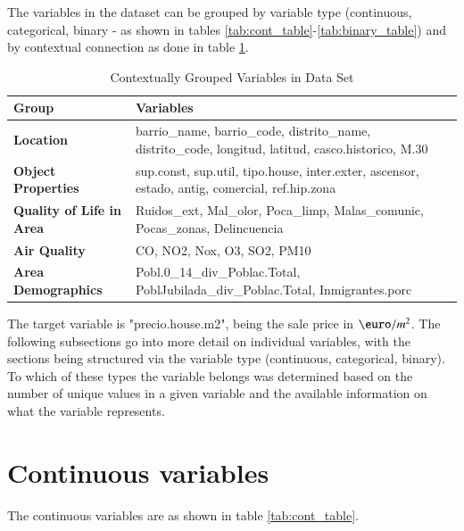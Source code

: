 \documentclass[11pt]{report} %
\begin{document}
The variables in the dataset can be grouped by variable type (continuous, categorical, binary - as shown in tables \ref{tab:cont_table}-\ref{tab:binary_table}) and by contextual connection as done in table \ref{tab:grouped_variables}.

\begin{table}[H]
\centering
\caption{Contextually Grouped Variables in Data Set}
\label{tab:grouped_variables}
\begin{tabular}{@{}lp{10cm}@{}}
\toprule
\textbf{Group} & \textbf{Variables} \\ \midrule
\textbf{Location} & barrio\_name, barrio\_code, distrito\_name, distrito\_code, longitud, latitud, casco.historico, M.30 \\ 
\textbf{Object Properties} & sup.const, sup.util, tipo.house, inter.exter, ascensor, estado, antig, comercial, ref.hip.zona \\ 
\textbf{Quality of Life in Area} & Ruidos\_ext, Mal\_olor, Poca\_limp, Malas\_comunic, Pocas\_zonas, Delincuencia \\ 
\textbf{Air Quality} & CO, NO2, Nox, O3, SO2, PM10 \\ 
\textbf{Area Demographics} & Pobl.0\_14\_div\_Poblac.Total, PoblJubilada\_div\_Poblac.Total, Inmigrantes.porc \\ \bottomrule
\end{tabular}
\end{table}


The target variable is "precio.house.m2", being the sale price in $\text{\euro}/m^2$. The following subsections go into more detail on individual variables, with the sections being structured via the variable type (continuous, categorical, binary). To which of these types the variable belongs was determined based on the number of unique values in a given variable and the available information on what the variable represents.


\section{Continuous variables}

The continuous variables are as shown in table \ref{tab:cont_table}.
\end{document}
